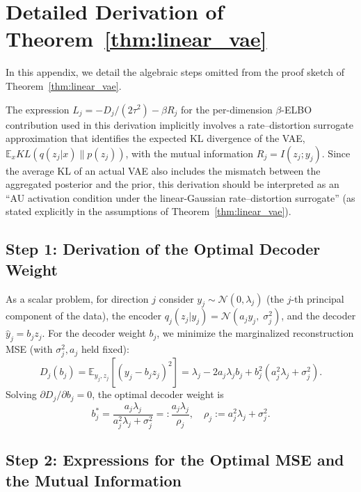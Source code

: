 \documentclass[make,article,submit,pdftex,moreauthors]{Definitions/mdpi}
\begin{document}
\section[\appendixname~\thesection]{Detailed Derivation of Theorem~\ref{thm:linear_vae}}\label{app:linear_vae_proof}

In this appendix, we detail the algebraic steps omitted from the proof sketch of
Theorem~\ref{thm:linear_vae}.

\begin{Remark}
The expression $L_j = -D_j/(2\tau^2) - \beta R_j$ for the per-dimension
$\beta$-ELBO contribution used in this derivation implicitly involves a
rate--distortion surrogate approximation that identifies the expected KL
divergence of the VAE, $\mathbb{E}_x KL(q(z_j|x)\|p(z_j))$, with the mutual
information $R_j = I(z_j; y_j)$.
Since the average KL of an actual VAE also includes the mismatch between the
aggregated posterior and the prior, this derivation should be interpreted as
an ``AU activation condition under the linear-Gaussian rate--distortion
surrogate'' (as stated explicitly in the assumptions of
Theorem~\ref{thm:linear_vae}).
\end{Remark}

\subsection*{Step 1: Derivation of the Optimal Decoder Weight}

As a scalar problem, for direction $j$ consider
$y_j \sim \mathcal{N}(0, \lambda_j)$ (the $j$-th principal component of the data),
the encoder $q_j(z_j | y_j) = \mathcal{N}(a_j y_j,\; \sigma_j^2)$,
and the decoder $\hat{y}_j = b_j z_j$.
For the decoder weight $b_j$, we minimize the marginalized reconstruction MSE
(with $\sigma_j^2, a_j$ held fixed):
\begin{equation}
  D_j(b_j) = \mathbb{E}_{y_j, z_j}[(y_j - b_j z_j)^2]
  = \lambda_j - 2 a_j \lambda_j b_j + b_j^2 (a_j^2 \lambda_j + \sigma_j^2).
  \label{eq:Dj_raw}
\end{equation}
Solving $\partial D_j / \partial b_j = 0$, the optimal decoder weight is
\begin{equation}
  b_j^* = \frac{a_j \lambda_j}{a_j^2 \lambda_j + \sigma_j^2}
         =: \frac{a_j \lambda_j}{\rho_j},
  \quad \rho_j := a_j^2 \lambda_j + \sigma_j^2.
  \label{eq:bj_opt}
\end{equation}

\subsection*{Step 2: Expressions for the Optimal MSE and the Mutual Information}
\end{document}
